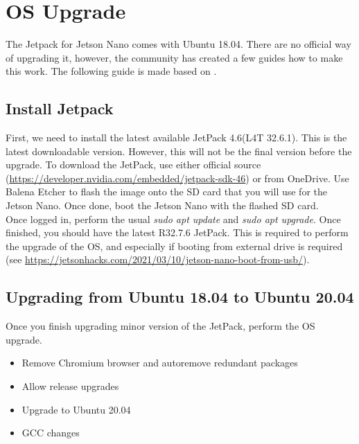 \chapter{OS Upgrade}
The Jetpack for Jetson Nano comes with Ubuntu 18.04. There are no official way of upgrading it, however, the community has created a few guides how to make this work. The following guide is made based on \cite{ubuntu_upgrade}.
\section{Install Jetpack}
First, we need to install the latest available JetPack 4.6(L4T 32.6.1). This is the latest downloadable version. However, this will not be the final version before the upgrade. To download the JetPack, use either official source (\url{https://developer.nvidia.com/embedded/jetpack-sdk-46}) or from OneDrive. Use Balena Etcher to flash the image onto the SD card that you will use for the Jetson Nano. Once done, boot the Jetson Nano with the flashed SD card.
\\
Once logged in, perform the usual \textit{sudo apt update} and \textit{sudo apt upgrade}. Once finished, you should have the latest R32.7.6 JetPack. 
This is required to perform the upgrade of the OS, and especially if booting from external drive is required (see \url{https://jetsonhacks.com/2021/03/10/jetson-nano-boot-from-usb/}).
\section{Upgrading from Ubuntu 18.04 to Ubuntu 20.04}
Once you finish upgrading minor version of the JetPack, perform the OS upgrade.
\begin{itemize}
    \item Remove Chromium browser and autoremove redundant packages
    \item Allow release upgrades
    \item Upgrade to Ubuntu 20.04
    \item GCC changes
\end{itemize}
